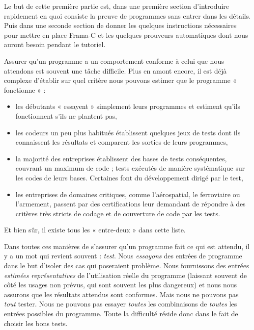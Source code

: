 \documentclass[middle]{zmdocument}
\begin{document}


Le but de cette première partie est, dans une première section d'introduire
rapidement en quoi consiste la preuve de programmes sans entrer dans les 
détails. Puis dans une seconde section de donner les quelques instructions 
nécessaires pour mettre en place Frama-C et les quelques prouveurs 
automatiques dont nous auront besoin pendant le tutoriel.







Assurer qu'un programme a un comportement conforme à celui que nous attendons
est souvent une tâche difficile. Plus en amont encore, il est déjà complexe 
d'établir sur quel critère nous pouvons estimer que le programme « fonctionne » :



\begin{itemize}
\item les débutants « essayent » simplement leurs programmes et estiment qu'ils 
fonctionnent s'ils ne plantent pas,
\item les codeurs un peu plus habitués établissent quelques jeux de tests dont ils
connaissent les résultats et comparent les sorties de leurs programmes,
\item la majorité des entreprises établissent des bases de tests conséquentes, 
couvrant un maximum de code ; tests exécutés de manière systématique sur les 
codes de leurs bases. Certaines font du développement dirigé par le test,
\item les entreprises de domaines critiques, comme l'aérospatial, le ferroviaire ou
l'armement, passent par des certifications leur demandant de répondre à des 
critères très stricts de codage et de couverture de code par les tests.
\end{itemize}


Et bien sûr, il existe tous les « entre-deux » dans cette liste.



Dans toutes ces manières de s'assurer qu'un programme fait ce qui est attendu, 
il y a un mot qui revient souvent : \textit{test}. Nous \textit{essayons} des entrées de 
programme dans le but d'isoler des cas qui poseraient problème. Nous fournissons
des entrées \textit{estimées représentatives} de l'utilisation réelle du programme
(laissant souvent de côté les usages non prévus, qui sont souvent les plus
dangereux) et 
nous nous assurons que les résultats attendus sont conformes. Mais nous ne 
pouvons pas \textit{tout} tester. Nous ne pouvons pas essayer \textit{toutes} les 
combinaisons de \textit{toutes} les entrées possibles du programme. Toute la 
difficulté réside donc dans le fait de choisir les bons tests.
\end{document}
